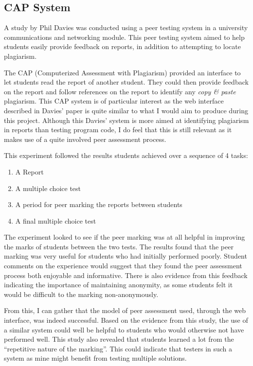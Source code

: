 \documentclass[a4paper,11pt]{report}
\begin{document}
\subsection{CAP System}
A study by Phil Davies\cite{davies_computerized_2000} was conducted using a peer testing system in a university communications and networking module. This peer testing system aimed to help students easily provide feedback on reports, in addition to attempting to locate plagiarism.\par
The CAP (Computerized Assessment with Plagiarism) provided an interface to let students read the report of another student. They could then provide feedback on the report and follow references on the report to identify any \textit{copy \& paste} plagiarism. This CAP system is of particular interest as the web interface described in Davies' paper is quite similar to what I would aim to produce during this project. Although this Davies' system is more aimed at identifying plagiarism in reports than testing program code, I do feel that this is still relevant as it makes use of a quite involved peer assessment process.\par
This experiment followed the results students achieved over a sequence of 4 tasks:
\begin{enumerate}
\item A Report
\item A multiple choice test
\item A period for peer marking the reports between students
\item A final multiple choice test
\end{enumerate}
The experiment looked to see if the peer marking was at all helpful in improving the marks of students between the two tests. The results found that the peer marking was very useful for students who had initially performed poorly. Student comments on the experience would suggest that they found the peer assessment process both enjoyable and informative. There is also evidence from this feedback indicating the importance of maintaining anonymity, as some students felt it would be difficult to the marking non-anonymously.\par
From this, I can gather that the model of peer assessment used, through the web interface, was indeed successful. Based on the evidence from this study, the use of a similar system could well be helpful to students who would otherwise not have performed well. This study also revealed that students learned a lot from the ``repetitive nature of the marking''. This could indicate that testers in such a system as mine might benefit from testing multiple solutions.
\end{document}
